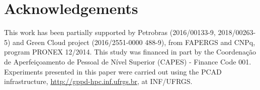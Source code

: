\documentclass[AMA,final,STIX1COL]{WileyNJD-v2}
\begin{document}


\section*{Acknowledgements}
This work has been partially supported by Petrobras (2016/00133-9, 2018/00263-5) and Green Cloud project (2016/2551-0000 488-9), from FAPERGS and CNPq, program PRONEX 12/2014. This study was financed in part by the Coordenação de Aperfeiçoamento de Pessoal de Nível Superior (CAPES) - Finance Code 001. Experiments presented in this paper were carried out using the PCAD infrastructure, \url{http://gppd-hpc.inf.ufrgs.br}, at INF/UFRGS.


\end{document}
